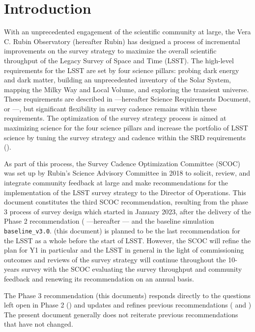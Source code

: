 \section{Introduction}

With an unprecedented engagement of the scientific community at large, the Vera C. Rubin Observatory (hereafter Rubin) has designed a process of incremental improvements on the survey strategy to maximize the overall scientific throughput of the Legacy Survey of Space and Time (LSST). The high-level requirements for the LSST are set by four science pillars: probing dark energy and dark matter, building an unprecedented inventory of the Solar System, mapping the Milky Way and Local Volume, and exploring the transient universe. These requirements are described in \cite{LPM-17} ---hereafter Science Requirements Document, or ---, but significant flexibility in survey cadence remains within these requirements. The optimization of the survey strategy process is aimed at maximizing science for the four science pillars and increase the portfolio of LSST science by tuning the survey strategy and cadence within the SRD requirements ().

As part of this process, the Survey Cadence Optimization Committee (SCOC) was set up by Rubin's Science Advisory Committee in 2018 to solicit, review, and integrate community feedback at large and make recommendations for the implementation of the LSST survey strategy to the Director of Operations. This document constitutes the third SCOC recommendation, resulting from the phase 3 process of survey design which started in January 2023, after the delivery of the Phase 2 recommendation  (\citealt{PSTN-055} ---hereafter --- and the baseline simulation \texttt{baseline\_v3.0}. \cite{PSTN-056} (this document) is planned to be the last recommendation for the LSST as a whole before the start of LSST. However, the SCOC will refine the plan for Y1 in particular and the LSST in general in the light of commissioning outcomes and reviews of the survey strategy will continue throughout the 10-years survey with the SCOC evaluating the survey throughput and community feedback and renewing its recommendation on an annual basis. 

The Phase 3 recommendation (this documents) responds directly to the questions left open in Phase 2 () and updates and refines previous recommendations ( and  ) The present document generally does not reiterate previous recommendations that have not changed.




